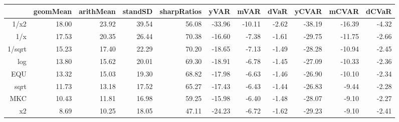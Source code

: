 \begin{table}[ht]
\centering
\begin{tabular}{rrrrrrrrrrr}
  \hline
 & geomMean & arithMean & standSD & sharpRatios & yVAR & mVAR & dVaR & yCVAR & mCVAR & dCVaR \\ 
  \hline
1/x2 & 18.00 & 23.92 & 39.54 & 56.08 & -33.96 & -10.11 & -2.62 & -38.19 & -16.39 & -4.32 \\ 
  1/x & 17.53 & 20.35 & 26.44 & 70.38 & -16.60 & -7.38 & -1.61 & -29.75 & -11.75 & -2.66 \\ 
  1/sqrt & 15.23 & 17.40 & 22.29 & 70.20 & -18.65 & -7.13 & -1.49 & -28.28 & -10.94 & -2.45 \\ 
  log & 13.80 & 15.62 & 20.01 & 69.30 & -18.91 & -6.78 & -1.45 & -27.09 & -10.33 & -2.36 \\ 
  EQU & 13.32 & 15.03 & 19.30 & 68.82 & -17.98 & -6.63 & -1.46 & -26.90 & -10.10 & -2.34 \\ 
  sqrt & 11.73 & 13.18 & 17.52 & 65.27 & -17.43 & -6.43 & -1.44 & -26.83 & -9.44 & -2.28 \\ 
  MKC & 10.43 & 11.81 & 16.98 & 59.25 & -15.98 & -6.40 & -1.48 & -28.07 & -9.10 & -2.27 \\ 
  x2 & 8.69 & 10.25 & 18.05 & 47.11 & -24.23 & -6.72 & -1.62 & -29.23 & -9.10 & -2.41 \\ 
   \hline
\end{tabular}
\end{table}
